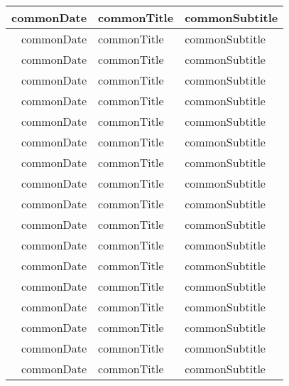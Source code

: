 \documentclass{article}
\newcommand{\dateOf}[1]{\csname commonDate#1\endcsname}
\newcommand{\titleOf}[1]{\csname commonTitle#1\endcsname}
\newcommand{\subtitleOf}[1]{\csname commonSubtitle#1\endcsname}
\begin{document}
\begin{longtable}[H]{|r|l|l|}
  \dateOf{\commonEventSix} & \titleOf{\commonEventSix} & \subtitleOf{\commonEventSix} \\ \hline
  \dateOf{\commonEventSeven} & \titleOf{\commonEventSeven} & \subtitleOf{\commonEventSeven} \\ \hline
  \dateOf{\commonEventEight} & \titleOf{\commonEventEight} & \subtitleOf{\commonEventEight} \\ \hline
  \dateOf{\commonEventNine} & \titleOf{\commonEventNine} & \subtitleOf{\commonEventNine} \\ \hline
  \dateOf{\commonEventTen} & \titleOf{\commonEventTen} & \subtitleOf{\commonEventTen} \\ \hline
  \dateOf{\commonEventEleven} & \titleOf{\commonEventEleven} & \subtitleOf{\commonEventEleven} \\ \hline
  \dateOf{\commonEventTwelve} & \titleOf{\commonEventTwelve} & \subtitleOf{\commonEventTwelve} \\ \hline
  \dateOf{\commonEventThirteen} & \titleOf{\commonEventThirteen} & \subtitleOf{\commonEventThirteen} \\ \hline
  \dateOf{\commonEventFourteen} & \titleOf{\commonEventFourteen} & \subtitleOf{\commonEventFourteen} \\ \hline
  \dateOf{\commonEventFifteen} & \titleOf{\commonEventFifteen} & \subtitleOf{\commonEventFifteen} \\ \hline
  \dateOf{\commonEventSixteen} & \titleOf{\commonEventSixteen} & \subtitleOf{\commonEventSixteen} \\ \hline
  \dateOf{\commonEventSeventeen} & \titleOf{\commonEventSeventeen} & \subtitleOf{\commonEventSeventeen} \\ \hline
  \dateOf{\commonEventEighteen} & \titleOf{\commonEventEighteen} & \subtitleOf{\commonEventEighteen} \\ \hline
  \dateOf{\commonEventNineteen} & \titleOf{\commonEventNineteen} & \subtitleOf{\commonEventNineteen} \\ \hline
  \dateOf{\commonEventTwenty} & \titleOf{\commonEventTwenty} & \subtitleOf{\commonEventTwenty} \\ \hline
  \dateOf{\commonEventTwentyOne} & \titleOf{\commonEventTwentyOne} & \subtitleOf{\commonEventTwentyOne} \\ \hline
  \dateOf{\commonEventTwentyTwo} & \titleOf{\commonEventTwentyTwo} & \subtitleOf{\commonEventTwentyTwo} \\ \hline
  \dateOf{\commonEventTwentyThree} & \titleOf{\commonEventTwentyThree} & \subtitleOf{\commonEventTwentyThree} \\ \hline

\end{longtable}
\end{document}
